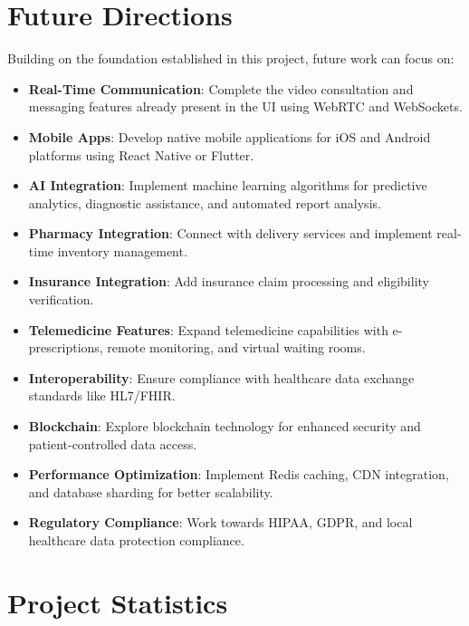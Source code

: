 \section{Future Directions}
Building on the foundation established in this project, future work can focus on:

\begin{itemize}
    \item \textbf{Real-Time Communication}: Complete the video consultation and messaging features already present in the UI using WebRTC and WebSockets.
    
    \item \textbf{Mobile Apps}: Develop native mobile applications for iOS and Android platforms using React Native or Flutter.
    
    \item \textbf{AI Integration}: Implement machine learning algorithms for predictive analytics, diagnostic assistance, and automated report analysis.
    
    \item \textbf{Pharmacy Integration}: Connect with delivery services and implement real-time inventory management.
    
    \item \textbf{Insurance Integration}: Add insurance claim processing and eligibility verification.
    
    \item \textbf{Telemedicine Features}: Expand telemedicine capabilities with e-prescriptions, remote monitoring, and virtual waiting rooms.
    
    \item \textbf{Interoperability}: Ensure compliance with healthcare data exchange standards like HL7/FHIR.
    
    \item \textbf{Blockchain}: Explore blockchain technology for enhanced security and patient-controlled data access.
    
    \item \textbf{Performance Optimization}: Implement Redis caching, CDN integration, and database sharding for better scalability.
    
    \item \textbf{Regulatory Compliance}: Work towards HIPAA, GDPR, and local healthcare data protection compliance.
\end{itemize}

\section{Project Statistics}

